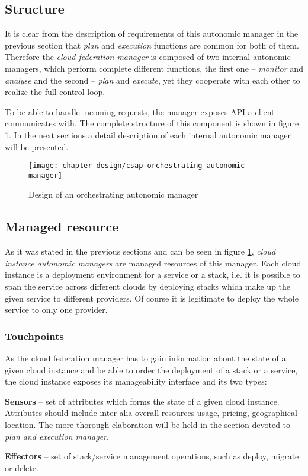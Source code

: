 \subsection{Structure}
It is clear from the description of requirements of this autonomic manager in the previous section that \emph{plan} and \emph{execution} functions are common for both of them. Therefore the \emph{cloud federation manager} is composed of two internal autonomic managers, which perform complete different functions, the first one -- \emph{monitor} and \emph{analyse} and the second -- \emph{plan} and \emph{execute}, yet they cooperate with each other to realize the full control loop.

To be able to handle incoming requests, the manager exposes API a client communicates with. The complete structure of this component is shown in figure \ref{img:orchestrating-autonomic-manager}. In the next sections a detail description of each internal autonomic manager will be presented.

\begin{figure}[!ht]
  \begin{center}
    \texttt{[image: chapter-design/csap-orchestrating-autonomic-manager]}
  \end{center}
  \caption{Design of an orchestrating autonomic manager}
  \label{img:orchestrating-autonomic-manager}
\end{figure}

\subsection{Managed resource}
As it was stated in the previous sections and can be seen in figure \ref{img:orchestrating-autonomic-manager}, \emph{cloud instance autonomic managers} are managed resources of this manager. Each cloud instance is a deployment environment for a service or a stack, i.e. it is possible to span the service across different clouds by deploying stacks which make up the given service to different providers. Of course it is legitimate to deploy the whole service to only one provider.
\subsubsection*{Touchpoints}
As the cloud federation manager has to gain information about the state of a given cloud instance and be able to order the deployment of a stack or a service, the cloud instance exposes its manageability interface and its two types:
\begin{asparaenum}
\item[\textbf{Sensors}] -- set of attributes which forms the state of a given cloud instance. Attributes should include inter alia overall resources usage, pricing, geographical location. The more thorough elaboration will be held in the section devoted to \emph{plan and execution manager}.
\item[\textbf{Effectors}] -- set of stack/service management operations, such as deploy, migrate or delete.
\end{asparaenum}

